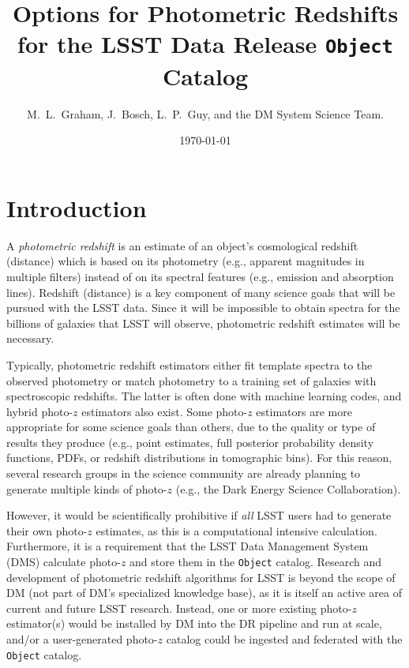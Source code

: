\documentclass[DM,lsstdraft,toc]{lsstdoc}
\title[Photo-$z$ for LSST Objects]{Options for Photometric Redshifts for the LSST Data Release {\tt Object} Catalog}
\author{M.~L.~Graham, J.~Bosch, L.~P.~Guy, and the DM System Science Team.}
\date{\today}
\begin{document}
\maketitle




\section{Introduction} \label{sec:intro}

A {\it photometric redshift} is an estimate of an object's cosmological redshift (distance) which is based on its photometry (e.g., apparent magnitudes in multiple filters) instead of on its spectral features (e.g., emission and absorption lines). 
Redshift (distance) is a key component of many science goals that will be pursued with the LSST data.
Since it will be impossible to obtain spectra for the billions of galaxies that LSST will observe, photometric redshift estimates will be necessary.

Typically, photometric redshift estimators either fit template spectra to the observed photometry or match photometry to a training set of galaxies with spectroscopic redshifts. 
The latter is often done with machine learning codes, and hybrid photo-$z$ estimators also exist. 
Some photo-$z$ estimators are more appropriate for some science goals than others, due to the quality or type of results they produce (e.g., point estimates, full posterior probability density functions, PDFs, or redshift distributions in tomographic bins).
For this reason, several research groups in the science community are already planning to generate multiple kinds of photo-$z$ (e.g., the Dark Energy Science Collaboration).

However, it would be scientifically prohibitive if \emph{all} LSST users had to generate their own photo-$z$ estimates, as this is a computational intensive calculation.
Furthermore, it is a requirement that the LSST Data Management System (DMS) calculate photo-$z$ and store them in the {\tt Object} catalog.
Research and development of photometric redshift algorithms for LSST is beyond the scope of DM (not part of DM's specialized knowledge base), as it is itself an active area of current and future LSST research.
Instead, one or more existing photo-$z$ estimator(s) would be installed by DM into the DR pipeline and run at scale, and/or a user-generated photo-$z$ catalog could be ingested and federated with the {\tt Object} catalog.
\end{document}
